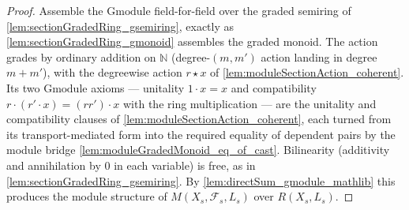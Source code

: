 \begin{proof}
    \leanok
  Assemble the \(\mathrm{Gmodule}\) field-for-field over the graded semiring of
  \cref{lem:sectionGradedRing_gsemiring}, exactly as
  \cref{lem:sectionGradedRing_gmonoid} assembles the graded monoid. The action grades
  by ordinary addition on \(\mathbb{N}\) (degree-\((m,m')\) action landing in degree
  \(m+m'\)), with the degreewise action \(r\star x\) of
  \cref{lem:moduleSectionAction_coherent}. Its two \(\mathrm{Gmodule}\) axioms ---
  unitality \(1 \cdot x = x\) and compatibility \(r \cdot (r' \cdot x) = (rr')\cdot x\)
  with the ring multiplication --- are the unitality and compatibility clauses of
  \cref{lem:moduleSectionAction_coherent}, each turned from its transport-mediated
  form into the required equality of dependent pairs by the module bridge
  \cref{lem:moduleGradedMonoid_eq_of_cast}. Bilinearity (additivity and annihilation by
  \(0\) in each variable) is free, as in \cref{lem:sectionGradedRing_gsemiring}. By
  \cref{lem:directSum_gmodule_mathlib} this produces the module structure of
  \(M(X_s,\mathcal{F}_s,L_s)\) over \(R(X_s,L_s)\).
\end{proof}
